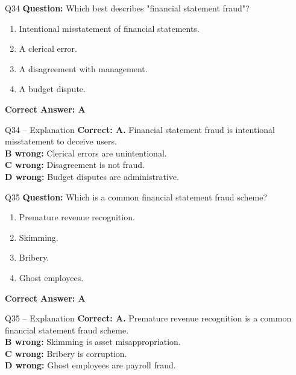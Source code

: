 \documentclass[aspectratio=169,10pt]{beamer}
\begin{document}
	\begin{frame}[t]{Q34}
		\small
		\textbf{Question:} Which best describes "financial statement fraud"?
		\begin{enumerate}[label=\Alph*.,itemsep=1pt,topsep=2pt]
			\item Intentional misstatement of financial statements.
			\item A clerical error.
			\item A disagreement with management.
			\item A budget dispute.
		\end{enumerate}
		\vspace{4pt}
		\textbf{Correct Answer: A}
	\end{frame}
	
	\begin{frame}[t]{Q34 -- Explanation}
		\small
		\textbf{Correct: A.} Financial statement fraud is intentional misstatement to deceive users. \\[4pt]
		\textbf{B wrong:} Clerical errors are unintentional. \\[2pt]
		\textbf{C wrong:} Disagreement is not fraud. \\[2pt]
		\textbf{D wrong:} Budget disputes are administrative.
	\end{frame}
	
	\begin{frame}[t]{Q35}
		\small
		\textbf{Question:} Which is a common financial statement fraud scheme?
		\begin{enumerate}[label=\Alph*.,itemsep=1pt,topsep=2pt]
			\item Premature revenue recognition.
			\item Skimming.
			\item Bribery.
			\item Ghost employees.
		\end{enumerate}
		\vspace{4pt}
		\textbf{Correct Answer: A}
	\end{frame}
	
	\begin{frame}[t]{Q35 -- Explanation}
		\small
		\textbf{Correct: A.} Premature revenue recognition is a common financial statement fraud scheme. \\[4pt]
		\textbf{B wrong:} Skimming is asset misappropriation. \\[2pt]
		\textbf{C wrong:} Bribery is corruption. \\[2pt]
		\textbf{D wrong:} Ghost employees are payroll fraud.
	\end{frame}
	
\end{document}
